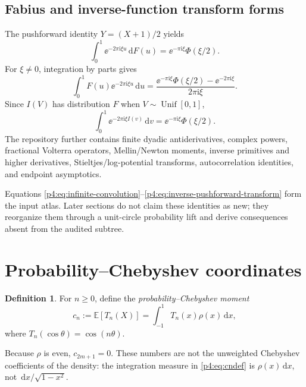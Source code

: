\documentclass[11pt,oneside]{article}
\theoremstyle{definition}
\newtheorem{definition}[theorem]{Definition}
\newcommand{\dd}{\,\mathrm d}
\newcommand{\ii}{\mathrm i}
\newcommand{\E}{\mathbb E}
\begin{document}
\subsection{Fabius and inverse-function transform forms}

The pushforward identity \(Y=(X+1)/2\) yields
\begin{equation}
 \int_0^1\ee^{-2\pi\ii\xi u}\dd F(u)
 =\ee^{-\pi\ii\xi}\Phi(\xi/2).
 \label{p4:eq:F-measure-transform}
\end{equation}
For \(\xi\ne0\), integration by parts gives
\begin{equation}
 \int_0^1F(u)\ee^{-2\pi\ii\xi u}\dd u
 =\frac{\ee^{-\pi\ii\xi}\Phi(\xi/2)-\ee^{-2\pi\ii\xi}}
 {2\pi\ii\xi}.
 \label{p4:eq:F-function-transform}
\end{equation}
Since \(I(V)\) has distribution \(F\) when \(V\sim\operatorname{Unif}[0,1]\),
\begin{equation}
 \int_0^1\ee^{-2\pi\ii\xi I(v)}\dd v
 =\ee^{-\pi\ii\xi}\Phi(\xi/2).
 \label{p4:eq:inverse-pushforward-transform}
\end{equation}
The repository further contains finite dyadic antiderivatives, complex powers, fractional
Volterra operators, Mellin/Newton moments, inverse primitives and higher derivatives,
Stieltjes/log-potential transforms, autocorrelation identities, and endpoint asymptotics.

\begin{baselinebox}
Equations \eqref{p4:eq:infinite-convolution}--\eqref{p4:eq:inverse-pushforward-transform} form the
input atlas. Later sections do not claim these identities as new; they reorganize them
through a unit-circle probability lift and derive consequences absent from the audited
subtree.
\end{baselinebox}

\section{Probability--Chebyshev coordinates}
\label{p4:sec:cheb}

\begin{definition}
For \(n\ge0\), define the \emph{probability--Chebyshev moment}
\begin{equation}
 c_n:=\E[T_n(X)]=\int_{-1}^{1}T_n(x)\rho(x)\dd x,
 \label{p4:eq:cndef}
\end{equation}
where \(T_n(\cos\theta)=\cos(n\theta)\).
\end{definition}

Because \(\rho\) is even, \(c_{2m+1}=0\). These numbers are not the unweighted Chebyshev
coefficients of the density: the integration measure in \eqref{p4:eq:cndef} is
\(\rho(x)\dd x\), not \(\dd x/\sqrt{1-x^2}\).
\end{document}
